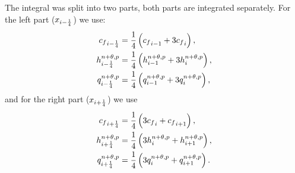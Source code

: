 The integral was split into two parts, both parts are integrated separately.
For the left part ($x_{i-\frac{1}{4}}$) we use:
\begin{align}
    {c_f}_{i-\frac{1}{4}} & = \frac{1}{4} \left( {c_f}_{i-1} + 3 {c_f}_{i} \right),
    \\
    h^{n+\theta, p}_{i-\frac{1}{4}} & = \frac{1}{4} \left( h^{n+\theta, p}_{i-1} + 3 h^{n+\theta, p}_{i} \right),
    \\
    q^{n+\theta, p}_{i-\frac{1}{4}} & = \frac{1}{4} \left( q^{n+\theta, p}_{i-1} + 3 q^{n+\theta, p}_{i} \right),
\end{align}
and for the right part ($x_{i+\frac{1}{4}}$) we use
\begin{align}
    {c_f}_{i+\frac{1}{4}} & = \frac{1}{4} \left( 3{c_f}_{i} + {c_f}_{i+1} \right),
    \\
    h^{n+\theta, p}_{i+\frac{1}{4}} & = \frac{1}{4} \left( 3 h^{n+\theta, p}_{i} + h^{n+\theta, p}_{i+1} \right),
    \\
    q^{n+\theta, p}_{i+\frac{1}{4}} & = \frac{1}{4} \left( 3 q^{n+\theta, p}_{i} + q^{n+\theta, p}_{i+1} \right).
\end{align}


